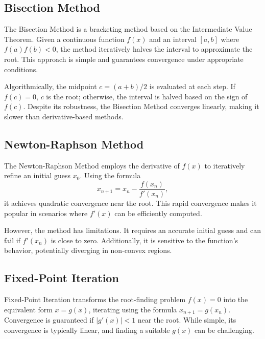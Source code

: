 \documentclass[10pt]{IEEEtran}
\begin{document}
\subsection{Bisection Method}
The Bisection Method is a bracketing method based on the Intermediate Value Theorem. Given a continuous function $f(x)$ and an interval $[a, b]$ where $f(a)f(b) < 0$, the method iteratively halves the interval to approximate the root. This approach is simple and guarantees convergence under appropriate conditions\cite{NumericalRootFindingAlgorithms2024}.

Algorithmically, the midpoint $c = (a + b)/2$ is evaluated at each step. If $f(c) = 0$, $c$ is the root; otherwise, the interval is halved based on the sign of $f(c)$. Despite its robustness, the Bisection Method converges linearly, making it slower than derivative-based methods\cite{petkovicComputersMathematicalResearch2020}.

\subsection{Newton-Raphson Method}
The Newton-Raphson Method employs the derivative of $f(x)$ to iteratively refine an initial guess $x_0$. Using the formula
\begin{equation}
    x_{n+1} = x_n - \frac{f(x_n)}{f'(x_n)},
\end{equation}
it achieves quadratic convergence near the root\cite{NumericalRootFindingAlgorithms2024}. This rapid convergence makes it popular in scenarios where $f'(x)$ can be efficiently computed\cite{petkovicComputersMathematicalResearch2020}.

However, the method has limitations. It requires an accurate initial guess and can fail if $f'(x_n)$ is close to zero. Additionally, it is sensitive to the function's behavior, potentially diverging in non-convex regions\cite{NumericalRootFindingAlgorithms2024}.

\subsection{Fixed-Point Iteration}
Fixed-Point Iteration transforms the root-finding problem $f(x) = 0$ into the equivalent form $x = g(x)$, iterating using the formula $x_{n+1} = g(x_n)$. Convergence is guaranteed if $|g'(x)| < 1$ near the root\cite{NumericalRootFindingAlgorithms2024}. While simple, its convergence is typically linear, and finding a suitable $g(x)$ can be challenging\cite{petkovicComputersMathematicalResearch2020}.
\end{document}
